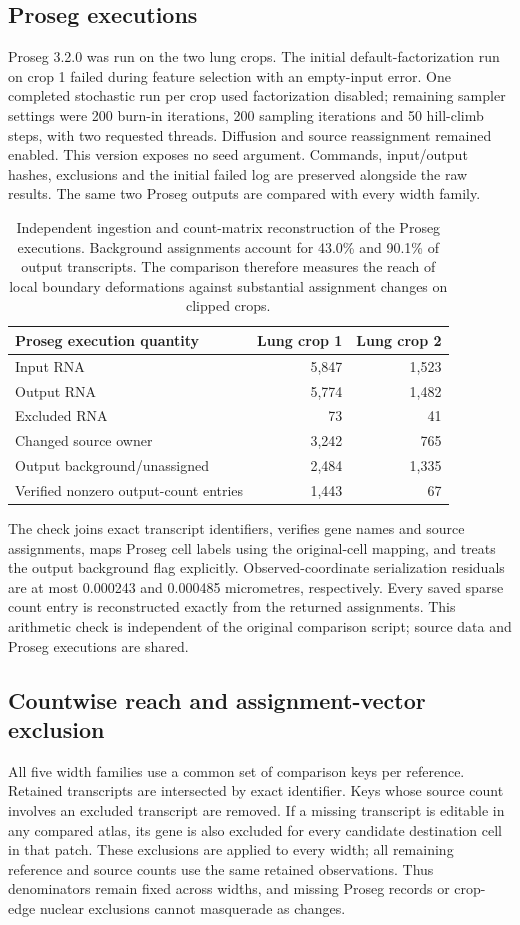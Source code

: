 \documentclass[10pt,letterpaper]{article}
\begin{document}
\subsection{Proseg executions}
Proseg 3.2.0 was run on the two lung crops. The initial default-factorization run on crop 1 failed during feature selection with an empty-input error. One completed stochastic run per crop used factorization disabled; remaining sampler settings were 200 burn-in iterations, 200 sampling iterations and 50 hill-climb steps, with two requested threads. Diffusion and source reassignment remained enabled. This version exposes no seed argument. Commands, input/output hashes, exclusions and the initial failed log are preserved alongside the raw results. The same two Proseg outputs are compared with every width family.

\begin{table}[ht]\centering\begin{tabular}{lrr}\toprule
Proseg execution quantity&Lung crop 1&Lung crop 2\\\midrule
Input RNA&5,847&1,523\\
Output RNA&5,774&1,482\\
Excluded RNA&73&41\\
Changed source owner&3,242&765\\
Output background/unassigned&2,484&1,335\\
Verified nonzero output-count entries&1,443&67\\\bottomrule\end{tabular}
\caption{Independent ingestion and count-matrix reconstruction of the Proseg executions. Background assignments account for 43.0\% and 90.1\% of output transcripts. The comparison therefore measures the reach of local boundary deformations against substantial assignment changes on clipped crops.}
\end{table}

The check joins exact transcript identifiers, verifies gene names and source assignments, maps Proseg cell labels using the original-cell mapping, and treats the output background flag explicitly. Observed-coordinate serialization residuals are at most 0.000243 and 0.000485 micrometres, respectively. Every saved sparse count entry is reconstructed exactly from the returned assignments. This arithmetic check is independent of the original comparison script; source data and Proseg executions are shared.

\subsection{Countwise reach and assignment-vector exclusion}
All five width families use a common set of comparison keys per reference. Retained transcripts are intersected by exact identifier. Keys whose source count involves an excluded transcript are removed. If a missing transcript is editable in any compared atlas, its gene is also excluded for every candidate destination cell in that patch. These exclusions are applied to every width; all remaining reference and source counts use the same retained observations. Thus denominators remain fixed across widths, and missing Proseg records or crop-edge nuclear exclusions cannot masquerade as changes.
\end{document}
